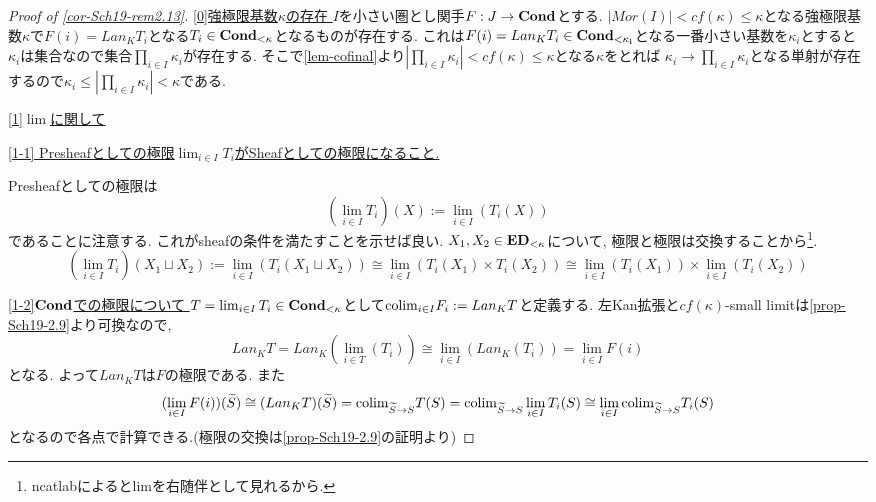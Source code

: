 \documentclass[dvipdfmx,a4paper,11pt]{article}
\newcommand{\colim}{{\rm colim}}
\theoremstyle{definition}
\begin{document}
\begin{proof}[Proof of \ref{cor-Sch19-rem2.13}]

\underline{[0]強極限基数$\kappa$の存在 }
$I$を小さい圏とし関手$F : J \to {\bf Cond}$とする.
$|Mor(I)| < cf(\kappa) \le \kappa$となる強極限基数$\kappa$で$F(i) = Lan_{K}T_i$となる$T_i \in {\bf Cond_{<\kappa}}$となるものが存在する.
これは$F(i) = Lan_{K}T_i \in {\bf Cond_{< \kappa_i}}$となる一番小さい基数を$\kappa_i$とすると
$\kappa_i$は集合なので集合$\prod_{i \in I}\kappa_i$が存在する. 
そこで\ref{lem-cofinal}より$|\prod_{i \in I}\kappa_i| < cf(\kappa) \le \kappa$となる$\kappa$をとれば
$\kappa_i \to \prod_{i \in I}\kappa_i$となる単射が存在するので$\kappa_i \le |\prod_{i \in I}\kappa_i| < \kappa$である. 

\underline{ [1]$\lim$に関して }

\underline{ [1-1] Presheafとしての極限$\lim_{i \in I}T_i$がSheafとしての極限になること.}

Presheafとしての極限は
$$
(\lim_{i \in I}T_i)(X):=\lim_{i \in I}(T_{i}(X))
$$
であることに注意する. これがsheafの条件を満たすことを示せば良い.
$X_1, X_2 \in {\bf ED}_{< \kappa}$について, 極限と極限は交換することから\footnote{ncatlabによるとlimを右随伴として見れるから.}.
$$
(\lim_{i \in I}T_i)(X_1 \sqcup  X_2 ) 
:= \lim_{i \in I}(T_i(X_1\sqcup X_2))
\cong 
\lim_{i \in I}(T_i(X_1)\times T_i( X_2))
\cong
\lim_{i \in I}(T_i(X_1))\times \lim_{i \in I}(T_i( X_2))
$$

 \underline{ [1-2]${\bf Cond}$での極限について }
 $T = \lim_{i \in I}T_i \in {\bf Cond}_{< \kappa}$として$\colim_{i \in I}F_i := Lan_{K}T$と定義する.
 左Kan拡張と$cf(\kappa)$-small limitは\ref{prop-Sch19-2.9}より可換なので, 
 $$
 Lan_{K}T=Lan_K(\lim_{i \in T}(T_i))\cong \lim_{i \in I}(Lan_{K}(T_i))
 =\lim_{i \in I}F(i)
 $$
 となる. よって$ Lan_{K}T$は$F$の極限である. 
  また
 $$
 (\lim_{i \in I}F(i))(\widetilde{S})
 \cong
  (Lan_{K}T)(\widetilde{S})
  =\colim_{\widetilde{S} \to S}T(S)
  =\colim_{\widetilde{S} \to S} \lim_{i \in I}T_i(S)
  \cong
   \lim_{i \in I} \colim_{\widetilde{S} \to S} T_i(S)
 $$
 となるので各点で計算できる.(極限の交換は\ref{prop-Sch19-2.9}の証明より)
 

\end{proof}
\end{document}

